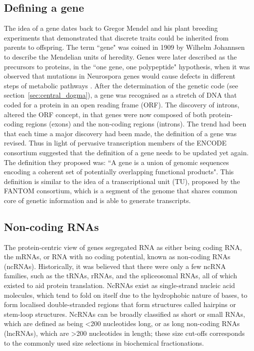 \subsection{Defining a gene}

The idea of a gene dates back to Gregor Mendel and his plant breeding experiments that demonstrated that discrete traits could be inherited from parents to offspring. The term ``gene" was coined in 1909 by Wilhelm Johannsen to describe the Mendelian units of heredity. Genes were later described as the precursors to proteins, in the ``one gene, one polypeptide" hypothesis, when it was observed that mutations in Neurospora genes would cause defects in different steps of metabolic pathways \cite{Beadle15111941}. After the determination of the genetic code (see section~\ref{sec:central_dogma}), a gene was recognised as a stretch of DNA that coded for a protein in an open reading frame (ORF). The discovery of introns\cite{pmid890740,pmid922889}, altered the ORF concept, in that genes were now composed of both protein-coding regions (exons) and the non-coding regions (introns). The trend had been that each time a major discovery had been made, the definition of a gene was revised. Thus in light of pervasive transcription members of the ENCODE consortium suggested that the definition of a gene needs to be updated yet again\cite{pmid17567988}. The definition they proposed was: ``A gene is a union of genomic sequences encoding a coherent set of potentially overlapping functional products"\cite{pmid17567988}. This definition is similar to the idea of a transcriptional unit (TU), proposed by the FANTOM consortium, which is a segment of the genome that shares common core of genetic information and is able to generate transcripts\cite{pmid12466851}.

\subsection{Non-coding RNAs}

The protein-centric view of genes segregated RNA as either being coding RNA, the mRNAs,  or RNA with no coding potential, known as non-coding RNAs (ncRNAs). Historically, it was believed that there were only a few ncRNA families, such as the tRNAs, rRNAs, and the spliceosomal RNAs, all of which existed to aid protein translation. NcRNAs exist as single-strand nucleic acid molecules, which tend to fold on itself due to the hydrophobic nature of bases, to form localised double-stranded regions that form structures called hairpins or stem-loop structures. NcRNAs can be broadly classified as short or small RNAs, which are defined as being \textless200 nucleotides long, or as long non-coding RNAs (lncRNAs), which are \textgreater200 nucleotides in length; these size cut-offs corresponds to the commonly used size selections in biochemical fractionations.

